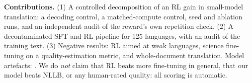 \textbf{Contributions.} (1) A controlled decomposition of an RL gain in small-model translation: a decoding control, a matched-compute control, seed and ablation runs, and an independent audit of the reward's own repetition check. (2) A decontaminated SFT and RL pipeline for 125 languages, with an audit of the training text. (3) Negative results: RL aimed at weak languages, science fine-tuning on a quality-estimation metric, and whole-document translation. Model artefacts: .
We do \emph{not} claim that RL beats more fine-tuning in general, that our model beats NLLB, or any human-rated quality: all scoring is automatic.
